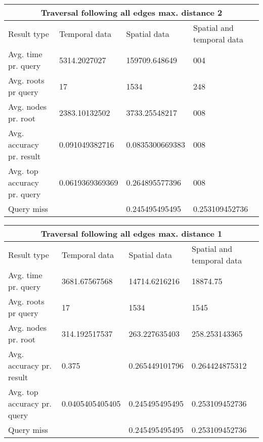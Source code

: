 \begin{tabular}{ |p{3cm}||p{3cm}|p{3cm}|p{3cm}|  }
	\hline
	\multicolumn{4}{|c|}{Traversal following all edges max. distance 2}                            \\
	\hline
	Result type                 & Temporal data   & Spatial data    & Spatial and temporal data \\
	\hline
	Avg. time pr. query         & 5314.2027027    & 159709.648649   & 004                       \\
	Avg. roots pr query         & 17              & 1534            & 248                       \\
	Avg. nodes pr. root         & 2383.10132502   & 3733.25548217   & 008                       \\
	Avg. accuracy pr. result    & 0.091049382716  & 0.0835300669383 & 008                       \\
	Avg. top accuracy pr. query & 0.0619369369369 & 0.264895577396  & 008                       \\
	Query miss                  &                 & 0.245495495495 & 0.253109452736            \\
	\hline
\end{tabular}
%
\begin{tabular}{ |p{3cm}||p{3cm}|p{3cm}|p{3cm}|  }
	\hline
	\multicolumn{4}{|c|}{Traversal following all edges max. distance 1}                        \\
	\hline
	Result type                 & Temporal data   & Spatial data   & Spatial and temporal data \\
	\hline
	Avg. time pr. query         & 3681.67567568   & 14714.6216216  & 18874.75                  \\
	Avg. roots pr query         & 17              & 1534           & 1545                      \\
	Avg. nodes pr. root         & 314.192517537   & 263.227635403  & 258.253143365             \\
	Avg. accuracy pr. result    & 0.375           & 0.265449101796 & 0.264424875312            \\
	Avg. top accuracy pr. query & 0.0405405405405 & 0.245495495495 & 0.253109452736            \\
	Query miss                  &                 & 0.245495495495 & 0.253109452736            \\
	\hline
\end{tabular}
%
